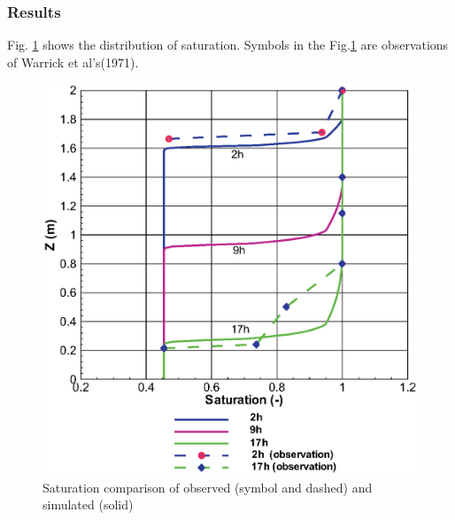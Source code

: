 \subsubsection*{Results}
Fig. \ref{us:result-warrick} shows the distribution of saturation.
Symbols in the Fig.\ref{us:result-warrick} are observations of
Warrick et al's(1971)\cite{Warrick:1971}.

\begin{figure} [!htb]
 \centering
\includegraphics[width=0.6\columnwidth]{H_US/figures/result_warrick.eps}
\caption{Saturation comparison of observed (symbol and dashed) and
simulated (solid)} \label{us:result-warrick}
\end{figure}

